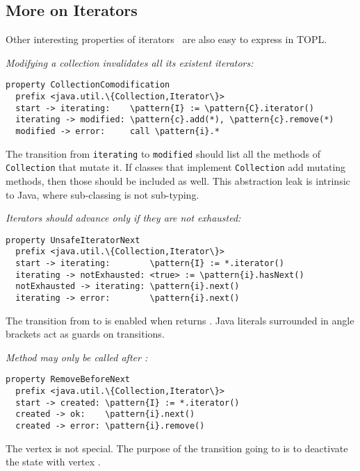 \documentclass{sigplanconf} %
\newcommand{\delimitVerbatim}{\par\nobreak\smallskip\noindent}
\newcommand{\pattern}[1]{\ensuremath{\mathtt{\underline{#1}}}}
\theoremstyle{definition}
\theoremstyle{remark}
\begin{document}
\subsection{More on Iterators} \label{sec:examples.iterators} %

Other interesting properties of iterators~\cite{dblp:conf/oopsla/naeeml08,dblp:conf/sigsoft/boddenlh08,haack2009} are also easy to express in TOPL\null.

\medskip\emph{Modifying a collection invalidates all its existent iterators:}
\delimitVerbatim
\begin{Verbatim}[commandchars=\\\{\}]
property CollectionComodification
  prefix <java.util.\{Collection,Iterator\}>
  start -> iterating:    \pattern{I} := \pattern{C}.iterator()
  iterating -> modified: \pattern{c}.add(*), \pattern{c}.remove(*)
  modified -> error:     call \pattern{i}.*
\end{Verbatim}
\delimitVerbatim
The transition from \texttt{iterating} to \texttt{modified} should list all the methods of \texttt{Collection} that mutate it.
If classes that implement \texttt{Collection} add mutating methods, then those should be included as well.
This abstraction leak is intrinsic to Java, where sub-classing is not sub-typing.

\medskip\emph{Iterators should advance only if they are not exhausted:}
\delimitVerbatim
\begin{Verbatim}[commandchars=\\\{\}]
property UnsafeIteratorNext
  prefix <java.util.\{Collection,Iterator\}>
  start -> iterating:        \pattern{I} := *.iterator()
  iterating -> notExhausted: <true> := \pattern{i}.hasNext()
  notExhausted -> iterating: \pattern{i}.next()
  iterating -> error:        \pattern{i}.next()
\end{Verbatim}
\delimitVerbatim
The transition from \Verb@iterating@ to \Verb@notExhausted@ is enabled when \Verb@hasNext@ returns \Verb@true@.
Java literals surrounded in angle brackets act as guards on transitions.

\medskip\emph{Method \Verb@remove@ may only be called after \Verb@next@:}
\delimitVerbatim
\begin{Verbatim}[commandchars=\\\{\}]
property RemoveBeforeNext
  prefix <java.util.\{Collection,Iterator\}>
  start -> created: \pattern{I} := *.iterator()
  created -> ok:    \pattern{i}.next()
  created -> error: \pattern{i}.remove()
\end{Verbatim}
\delimitVerbatim
The vertex \Verb@ok@ is not special.
The purpose of the transition going to \Verb@ok@ is to deactivate the state with vertex \Verb@created@.
\end{document}
